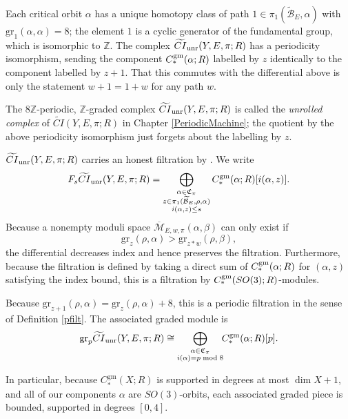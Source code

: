 \documentclass{memo-l}
\theoremstyle{definition}
\theoremstyle{remark}
\numberwithin{section}{chapter}
\numberwithin{equation}{chapter}
\begin{document}
Each critical orbit $\alpha$ has a unique homotopy class of path $1 \in \pi_1(\widetilde{\mathcal B}_E, \alpha)$ with $\text{gr}_1(\alpha, \alpha) = 8$; the element $1$ is a cyclic generator of the fundamental group, which is isomorphic to $\mathbb Z$. The complex $\widetilde{CI}_\textup{unr}(Y,E,\pi;R)$ has a periodicity isomorphism, sending the component $C_*^{\textup{gm}}(\alpha;R)$ labelled by $z$ identically to the component labelled by $z + 1$. That this commutes with the differential above is only the statement $w + 1 = 1 + w$ for any path $w$.

The $8\mathbb Z$-periodic, $\mathbb Z$-graded complex $\widetilde{CI}_\textup{unr}(Y,E,\pi;R)$ is called the \emph{unrolled complex} of $\widetilde{CI}(Y, E, \pi; R)$ in Chapter \ref{PeriodicMachine}; the quotient by the above periodicity isomorphism just forgets about the labelling by $z$.

$\widetilde{CI}_\textup{unr}(Y,E,\pi;R)$ carries an honest filtration by . We write $$F_s\widetilde{CI}_\textup{unr}(Y,E,\pi;R) = \bigoplus_{\substack{\alpha \in \mathfrak C_\pi\\z \in \pi_1(\widetilde{\mathcal B}_E, \rho, \alpha)\\i(\alpha, z) \leq s}} C_{*}^{\textup{gm}}(\alpha;R)[i(\alpha,z)].$$ Because a nonempty moduli space $\overline{\mathcal M}_{E,w,\pi}(\alpha, \beta)$ can only exist if $$\text{gr}_z(\rho, \alpha) > \text{gr}_{z \ast w}(\rho, \beta),$$ the differential decreases index and hence preserves the filtration. Furthermore, because the filtration is defined by taking a direct sum of $C_*^{\textup{gm}}(\alpha;R)$ for $(\alpha, z)$ satisfying the index bound, this is a filtration by $C_*^{\textup{gm}}(SO(3);R)$-modules.

Because $\text{gr}_{z+1}(\rho, \alpha) = \text{gr}_z(\rho, \alpha) + 8$, this is a periodic filtration in the sense of Definition \ref{pfilt}. The associated graded module is $$\text{gr}_p \widetilde{CI}_\textup{unr}(Y, E, \pi; R) \cong \bigoplus_{\substack{\alpha \in \mathfrak C_\pi \\ i(\alpha) = p \bmod 8}}\!\! C^{\text{gm}}_*(\alpha; R)[p].$$

In particular, because $C_*^{\text{gm}}(X;R)$ is supported in degrees at most $\dim X + 1$, and all of our components $\alpha$ are $SO(3)$-orbits, each associated graded piece is bounded, supported in degrees $[0, 4]$.
\end{document}
